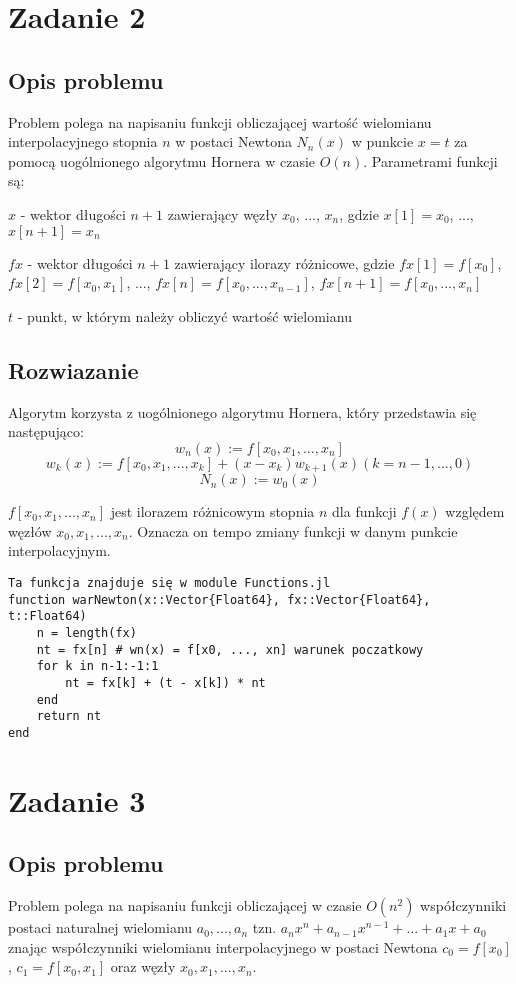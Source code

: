 \documentclass{article}
\begin{document}
\section{Zadanie 2}
\subsection{Opis problemu}
Problem polega na napisaniu funkcji obliczającej wartość wielomianu interpolacyjnego stopnia $n$ w postaci Newtona $N_n(x)$ w punkcie $x = t$ za pomocą uogólnionego algorytmu Hornera w czasie $O(n)$. Parametrami funkcji są:
\begin{center}
$x$ - wektor długości $n + 1$ zawierający węzły $x_0$, ..., $x_n$, gdzie $x[1] = x_0$, ..., $x[n+1] = x_n$
\vspace{5pt}

$fx$ - wektor długości $n + 1$ zawierający ilorazy różnicowe, gdzie $fx[1] = f[x_0]$, $fx[2] = f[x_0, x_1]$, ..., $fx[n] = f[x_0, ..., x_{n-1}]$, $fx[n+1] = f[x_0, ..., x_n]$
\vspace{5pt}

$t$ - punkt, w którym należy obliczyć wartość wielomianu
\end{center}
\subsection{Rozwiazanie}
Algorytm korzysta z uogólnionego algorytmu Hornera, który przedstawia się następująco:
$$ w_n(x) := f[x_0, x_1, ..., x_n] $$
$$ w_k(x) := f[x_0, x_1, ..., x_k] + (x - x_k)w_{k + 1}(x) (k = n - 1, ..., 0)$$
$$ N_n(x) := w_0(x) $$

$f[x_0, x_1, ..., x_n]$ jest ilorazem różnicowym stopnia $n$ dla funkcji $f(x)$ względem węzłów $x_0, x_1, ..., x_n $. Oznacza on tempo zmiany funkcji w danym punkcie interpolacyjnym.
\begin{verbatim}
Ta funkcja znajduje się w module Functions.jl
function warNewton(x::Vector{Float64}, fx::Vector{Float64}, t::Float64)
    n = length(fx)
    nt = fx[n] # wn(x) = f[x0, ..., xn] warunek poczatkowy
    for k in n-1:-1:1
        nt = fx[k] + (t - x[k]) * nt
    end
    return nt
end
\end{verbatim}

\section{Zadanie 3}
\subsection{Opis problemu}
Problem polega na napisaniu funkcji obliczającej w czasie $O(n^2)$ współczynniki postaci naturalnej wielomianu $a_0, ..., a_n$ tzn. $a_nx^n + a_{n-1}x^{n-1} + ... + a_1x + a_0$ znając współczynniki wielomianu interpolacyjnego w postaci Newtona $c_0 = f[x_0]$, $c_1 = f[x_0, x_1] $ oraz węzły $x_0, x_1, ..., x_n$.
\end{document}
